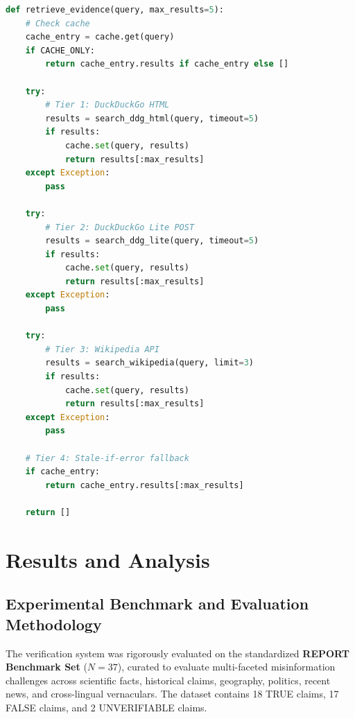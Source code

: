 \documentclass[12pt,a4paper]{report}
\begin{document}
\begin{lstlisting}[language=Python, caption={Algorithm 2: Multi-Tier Resilient Evidence Retrieval}, label={alg:retrieval}]
def retrieve_evidence(query, max_results=5):
    # Check cache
    cache_entry = cache.get(query)
    if CACHE_ONLY:
        return cache_entry.results if cache_entry else []
        
    try:
        # Tier 1: DuckDuckGo HTML
        results = search_ddg_html(query, timeout=5)
        if results:
            cache.set(query, results)
            return results[:max_results]
    except Exception:
        pass
        
    try:
        # Tier 2: DuckDuckGo Lite POST
        results = search_ddg_lite(query, timeout=5)
        if results:
            cache.set(query, results)
            return results[:max_results]
    except Exception:
        pass
        
    try:
        # Tier 3: Wikipedia API
        results = search_wikipedia(query, limit=3)
        if results:
            cache.set(query, results)
            return results[:max_results]
    except Exception:
        pass
        
    # Tier 4: Stale-if-error fallback
    if cache_entry:
        return cache_entry.results[:max_results]
        
    return []
\end{lstlisting}

\chapter{Results and Analysis}

\section{Experimental Benchmark and Evaluation Methodology}
The verification system was rigorously evaluated on the standardized \textbf{REPORT Benchmark Set} ($N = 37$), curated to evaluate multi-faceted misinformation challenges across scientific facts, historical claims, geography, politics, recent news, and cross-lingual vernaculars. The dataset contains 18 TRUE claims, 17 FALSE claims, and 2 UNVERIFIABLE claims. 
\end{document}
